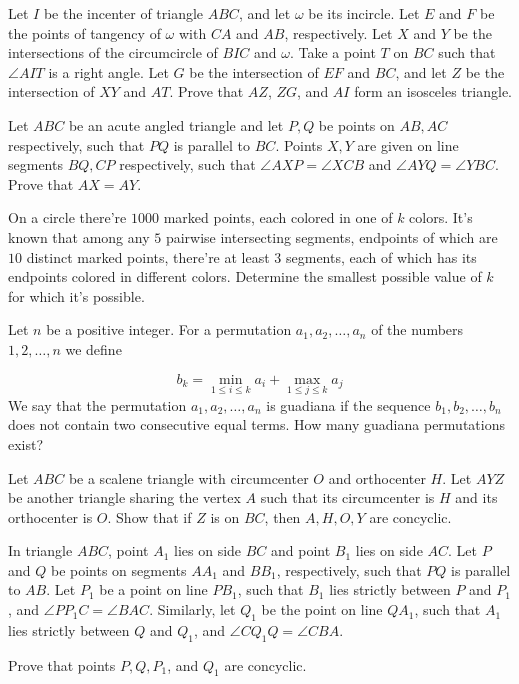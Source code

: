 \documentclass[11pt]{scrartcl}
\begin{document}
\begin{problem}[651490142085731]
	Let $I$ be the incenter of triangle $ABC$, and let $\omega$ be its incircle. Let $E$ and $F$ be the points of tangency of $\omega$ with $CA$ and $AB$, respectively. Let $X$ and $Y$ be the intersections of the circumcircle of $BIC$ and $\omega$. Take a point $T$ on $BC$ such that $\angle AIT$ is a right angle. Let $G$ be the intersection of $EF$ and $BC$, and let $Z$ be the intersection of $XY$ and $AT$. Prove that $AZ$, $ZG$, and $AI$ form an isosceles triangle.
\end{problem}
\begin{problem}[143601603071770]
	Let $ABC$ be an acute angled triangle and let $P, Q$ be points on $AB, AC$ respectively, such that $PQ$ is parallel to $BC$. Points $X, Y$ are given on line segments $BQ, CP$ respectively, such that $\angle AXP = \angle XCB$ and $\angle AYQ = \angle YBC$. Prove that $AX = AY$.

\end{problem}
\begin{problem}[4738483219849723703]
On a circle there're $1000$ marked points, each colored in one of $k$ colors. It's known that among any $5$ pairwise intersecting segments, endpoints of which are $10$ distinct marked points, there're at least $3$ segments, each of which has its endpoints colored in different colors. Determine the smallest possible value of $k$ for which it's possible.
\end{problem}
\begin{problem}[351896324490208]
Let $n$ be a positive integer. For a permutation $a_1, a_2, \dots, a_n$ of the numbers $1, 2, \dots, n$ we define

$$b_k = \min_{1 \leq i \leq k} a_i + \max_{1 \leq j \leq k} a_j$$
We say that the permutation $a_1, a_2, \dots, a_n$ is guadiana if the sequence $b_1, b_2, \dots, b_n$ does not contain two consecutive equal terms. How many guadiana permutations exist?
\end{problem}
\begin{problem}[4948608980214807448]
	Let $ABC$ be a scalene triangle with circumcenter $O$ and orthocenter $H$. Let $AYZ$ be another triangle sharing the vertex $A$ such that its circumcenter is $H$ and its orthocenter is $O$. Show that if $Z$ is on $BC$, then $A,H,O,Y$ are concyclic.
\end{problem}
\begin{problem}[684771433215596]
In triangle $ABC$, point $A_1$ lies on side $BC$ and point $B_1$ lies on side $AC$. Let $P$ and $Q$ be points on segments $AA_1$ and $BB_1$, respectively, such that $PQ$ is parallel to $AB$. Let $P_1$ be a point on line $PB_1$, such that $B_1$ lies strictly between $P$ and $P_1$, and $\angle PP_1C=\angle BAC$. Similarly, let $Q_1$ be the point on line $QA_1$, such that $A_1$ lies strictly between $Q$ and $Q_1$, and $\angle CQ_1Q=\angle CBA$.

Prove that points $P,Q,P_1$, and $Q_1$ are concyclic.
\end{problem}
\end{document}
